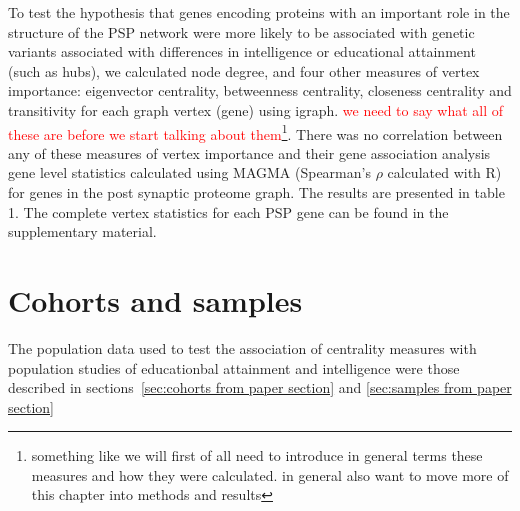 \label{sec:Measurs of vertex importance from paper}
To test the hypothesis that genes encoding proteins with an important role in the structure of the PSP network were more likely to be associated with genetic variants associated with differences in intelligence or educational attainment (such as hubs), we calculated node degree, and four other measures of vertex importance: eigenvector centrality, betweenness centrality, closeness centrality and transitivity for each graph vertex (gene) using igraph. \cite{csardi2006igraph} \textcolor{red}{we need to say what all of these are before we start talking about them}\footnote{something like we will first of all need to introduce in general terms these measures and how they were calculated. in general also want to move more of this chapter into methods and results}. There was no correlation between any of these measures of vertex importance and their gene association analysis gene level statistics calculated using MAGMA (Spearman’s $\rho$ calculated with R) for genes in the post synaptic proteome graph. The results are presented in table 1. The complete vertex statistics for each PSP gene can be found in the supplementary material. 

\section{Cohorts and samples}
\label{Centrality:cohorts and samples}
The population data used to test the association of centrality measures with population studies of educationbal attainment and intelligence were those described in sections~\ref{sec:cohorts from paper section} and \ref{sec:samples from paper section}









